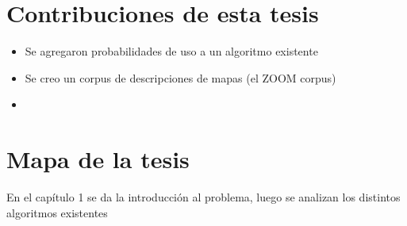

\section{Contribuciones de esta tesis}
\label{sec:contribiciones}

\begin{itemize}
\item Se agregaron probabilidades de uso a un algoritmo existente
\item Se creo un corpus de descripciones de mapas (el ZOOM corpus)
\item
\end{itemize}
\section{Mapa de la tesis}
\label{sec:mapadetesis}

En el cap\'itulo 1 se da la introducci\'on al problema, luego se analizan los distintos algoritmos existentes

